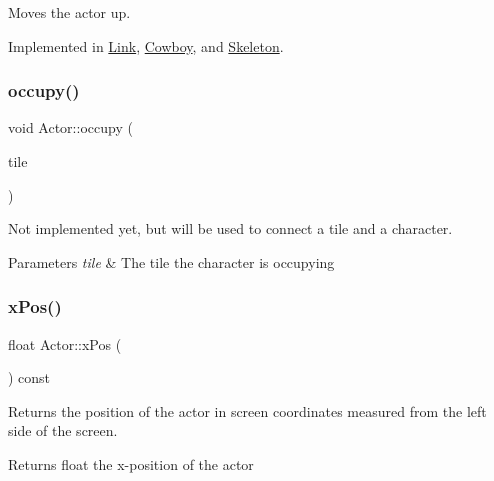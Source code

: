 Moves the actor up. 



Implemented in \mbox{\hyperlink{classLink_a850a1e6c7a68d921b36d30dc918a7668}{Link}}, \mbox{\hyperlink{classCowboy_a3c4b0540c47492d02fa64b4740a35bcf}{Cowboy}}, and \mbox{\hyperlink{classSkeleton_a0ddbea7574ada0b5cef0cadbd4a0dd9f}{Skeleton}}.

\mbox{\label{classActor_a75f9ef62ab9b6f7879cf0c1483b73866}} 
\subsubsection{\texorpdfstring{occupy()}{occupy()}}
{\footnotesize\ttfamily void Actor\+::occupy (\begin{DoxyParamCaption}\item[{\mbox{\hyperlink{classTile}{Tile}} $\ast$}]{tile }\end{DoxyParamCaption})}



Not implemented yet, but will be used to connect a tile and a character. 


\begin{DoxyParams}{Parameters}
{\em tile} & The tile the character is occupying \\
\hline
\end{DoxyParams}
\mbox{\label{classActor_ab460c32c344963afcf476926367bd794}} 
\subsubsection{\texorpdfstring{xPos()}{xPos()}}
{\footnotesize\ttfamily float Actor\+::x\+Pos (\begin{DoxyParamCaption}{ }\end{DoxyParamCaption}) const\hspace{0.3cm}{\ttfamily [virtual]}}



Returns the position of the actor in screen coordinates measured from the left side of the screen. 

\begin{DoxyReturn}{Returns}
float the x-\/position of the actor 
\end{DoxyReturn}
\mbox{\label{classActor_a7792909f3e9ca8eff707cf7b21b712fe}} 
